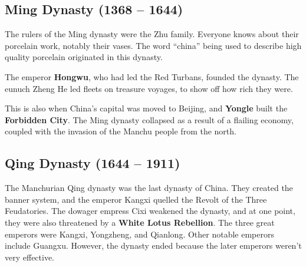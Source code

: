\subsection*{Ming Dynasty (1368 -- 1644)}

The rulers of the Ming dynasty were the Zhu family.
Everyone knows about their porcelain work, notably their vases.
The word ``china'' being used to describe high quality porcelain originated in this dynasty.

The emperor \textbf{Hongwu}, who had led the Red Turbans, founded the dynasty.
The eunuch Zheng He led fleets on treasure voyages, to show off how rich they were.

This is also when China's capital was moved to Beijing, and \textbf{Yongle} built the \textbf{Forbidden City}.
The Ming dynasty collapsed as a result of a flailing economy,
coupled with the invasion of the Manchu people from the north.

\subsection*{Qing Dynasty (1644 -- 1911)}

The Manchurian Qing dynasty was the last dynasty of China.
They created the banner system, and the emperor Kangxi quelled the Revolt of the Three Feudatories.
The dowager empress Cixi weakened the dynasty, and at one point,
they were also threatened by a \textbf{White Lotus Rebellion}.
The three great emperors were Kangxi, Yongzheng, and Qianlong.
Other notable emperors include Guangxu.
However, the dynasty ended because the later emperors weren't very effective.



